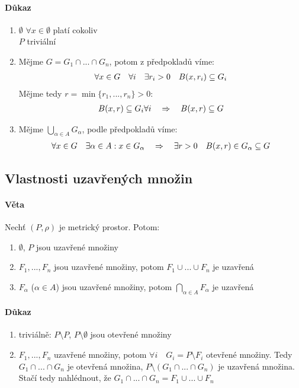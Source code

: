 \documentclass[a4paper,10pt]{article}
\begin{document}
\paragraph{Důkaz}
\begin{enumerate}
	\item $\emptyset$ $\forall x \in \emptyset$ platí cokoliv \\
		$P$ triviální
	\item Mějme $G = G_1 \cap ... \cap G_n$, potom z předpokladů víme:
		\begin{align}
			\forall x \in G \quad \forall i \quad \exists r_i > 0 \quad B(x,
			r_i) \subseteq G_i
		\end{align}
		Mějme tedy $r = \min \{ r_1, ..., r_n \} > 0$:
		\begin{align}
			B(x, r) \subseteq G_i \forall i \quad \Rightarrow \quad  B(x,r) \subseteq G
		\end{align}
	\item Mějme $\bigcup_{\alpha \in A} G_\alpha$, podle předpokladů víme:
		\begin{align}
			\forall x \in G \quad \exists \alpha \in A : x \in G_\alpha \quad 
			\Rightarrow \quad  \exists r > 0 \quad B(x,r) \in G_\alpha \subseteq G
		\end{align}
\end{enumerate}


\subsection{Vlastnosti uzavřených množin}
\setcounter{equation}{0}
\paragraph{Věta}
Nechť $(P, \rho)$ je metrický prostor. Potom:
\begin{enumerate}
	\item $\emptyset$, $P$ jsou uzavřené množiny
	\item $F_1, ..., F_n$ jsou uzavřené množiny, potom $F_1 \cup ... \cup F_n$
	je uzavřená
	\item $F_\alpha$ ($\alpha \in A$) jsou uzavřené množiny, 
		 potom $\bigcap_{\alpha \in A} F_\alpha$ je uzavřená
\end{enumerate}
\paragraph{Důkaz}
\begin{enumerate}
	\item triviálně: $P \setminus P$, $P \setminus\emptyset$ jsou otevřené
		množiny
	\item $F_1,... ,F_n$ uzavřené množiny, potom $\forall i \quad  G_i = P
		\setminus F_i$ otevřené množiny. Tedy $G_1 \cap ... \cap G_n$ je
		otevřená množina, $P \setminus ( G_1 \cap ... \cap G_n )$ je uzavřená
		množina. Stačí tedy nahlédnout, že $G_1 \cap ... \cap G_n = F_1 \cup ...
		\cup F_n$
\end{enumerate}
\end{document}
